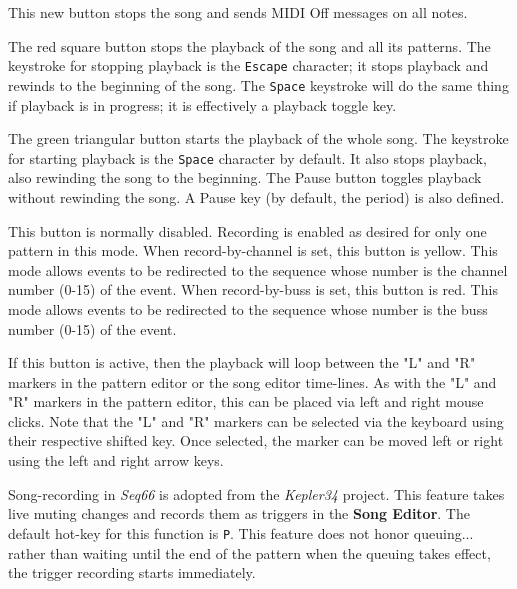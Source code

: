    \setcounter{ItemCounter}{0}      %

   This new button stops the song and sends MIDI Off messages on all notes.

   The red square button stops the playback of the song and all its patterns.
   The keystroke for stopping playback is the \texttt{Escape} character; it
   stops playback and rewinds to the beginning of the song.
   The \texttt{Space} keystroke will do the same thing if playback is in
   progress; it is effectively a playback toggle key.

   The green triangular button starts the playback of the whole song.
   The keystroke for starting playback is the \texttt{Space} character by
   default.  It also stops playback, also rewinding the song to the beginning.
   The Pause button toggles playback without rewinding the song.
   A Pause key (by default, the period) is also defined.

   This button is normally disabled.
   Recording is enabled as desired for only one pattern in this mode.
   When record-by-channel is set, this button is yellow.
   This mode allows events to be redirected to the sequence whose number is the
   channel number (0-15) of the event.
   When record-by-buss is set, this button is red.
   This mode allows events to be redirected to the sequence whose number is the
   buss number (0-15) of the event.

   If this button is active, then the playback will loop
   between the "L" and "R" markers in the pattern editor or the song editor
   time-lines.
   As with the "L" and "R" markers in the pattern editor, this can
   be placed via left and right mouse clicks.
   Note that the "L" and "R" markers can be selected via the keyboard using
   their respective shifted key.  Once selected, the marker can be moved left
   or right using the left and right arrow keys.

   Song-recording in \textsl{Seq66} is adopted from the
   \textsl{Kepler34} project.
   This feature takes live muting changes and records them as
   triggers in the \textbf{Song Editor}.
   The default hot-key for this function is \texttt{P}.
   This feature does not honor queuing...
   rather than waiting until the end of the pattern when the queuing takes
   effect, the trigger recording starts immediately.

